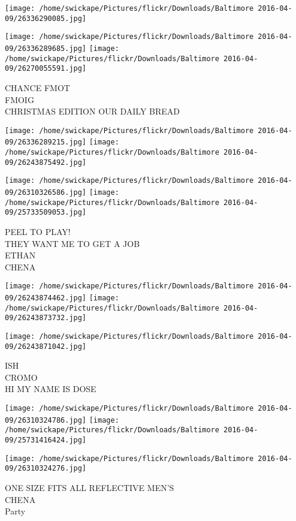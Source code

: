\documentclass[10pt,letterpaper]{article}
\begin{document}
\texttt{[image: /home/swickape/Pictures/flickr/Downloads/Baltimore 2016-04-09/26336290085.jpg]}

\vspace{0.25in}
\texttt{[image: /home/swickape/Pictures/flickr/Downloads/Baltimore 2016-04-09/26336289685.jpg]}
\texttt{[image: /home/swickape/Pictures/flickr/Downloads/Baltimore 2016-04-09/26270055591.jpg]}

CHANCE FMOT\\
FMOIG\\
CHRISTMAS EDITION OUR DAILY BREAD
\pagebreak

\texttt{[image: /home/swickape/Pictures/flickr/Downloads/Baltimore 2016-04-09/26336289215.jpg]}
\texttt{[image: /home/swickape/Pictures/flickr/Downloads/Baltimore 2016-04-09/26243875492.jpg]}

\texttt{[image: /home/swickape/Pictures/flickr/Downloads/Baltimore 2016-04-09/26310326586.jpg]}
\texttt{[image: /home/swickape/Pictures/flickr/Downloads/Baltimore 2016-04-09/25733509053.jpg]}

PEEL TO PLAY!\\
THEY WANT ME TO GET A JOB\\
ETHAN\\
CHENA
\pagebreak

\texttt{[image: /home/swickape/Pictures/flickr/Downloads/Baltimore 2016-04-09/26243874462.jpg]}
\texttt{[image: /home/swickape/Pictures/flickr/Downloads/Baltimore 2016-04-09/26243873732.jpg]}

\vspace{0.25in}
\texttt{[image: /home/swickape/Pictures/flickr/Downloads/Baltimore 2016-04-09/26243871042.jpg]}

ISH\\
CROMO\\
HI MY NAME IS DOSE
\pagebreak

\texttt{[image: /home/swickape/Pictures/flickr/Downloads/Baltimore 2016-04-09/26310324786.jpg]}
\texttt{[image: /home/swickape/Pictures/flickr/Downloads/Baltimore 2016-04-09/25731416424.jpg]}

\vspace{0.25in}
\texttt{[image: /home/swickape/Pictures/flickr/Downloads/Baltimore 2016-04-09/26310324276.jpg]}

ONE SIZE FITS ALL REFLECTIVE MEN'S\\
CHENA\\
Party
\pagebreak
\end{document}
